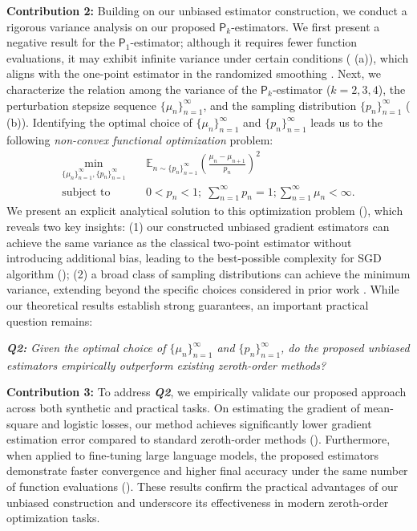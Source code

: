 \documentclass{article}
\newcommand{\EE}{\mathbb{E}}
\theoremstyle{definition}
\theoremstyle{plain}
\theoremstyle{remark}
\newcommand{\centerbox}[1]{\begin{center}\begin{minipage}{0.86\linewidth}
\begin{bluebox} 
\textit{{#1}}
\end{bluebox} \end{minipage}\end{center}}
\newcommand{\sfP}{\mathsf{P}}
\begin{document}
\textbf{Contribution 2:}  
Building on our unbiased estimator construction, we conduct a rigorous variance analysis on our proposed $\sfP_k$-estimators.  We first present a negative result for the $\sfP_1$-estimator;  although it requires fewer function evaluations, it may exhibit infinite variance under certain conditions ( (a)), which aligns with the one-point estimator in the randomized smoothing \citep{flaxman2005online}.   Next, we characterize the relation among the variance of  the $\sfP_k$-estimator ($k=2,3,4$), the perturbation stepsize sequence $\{\mu_n\}_{n=1}^\infty$, and the sampling distribution $\{p_n\}_{n=1}^\infty$ ( (b)). Identifying the optimal  choice of  $\{\mu_n\}_{n=1}^\infty$ and $\{p_n\}_{n=1}^\infty$ leads us to the following \textit{non-convex functional optimization} problem: 
\begin{align}\label{eq:functional-opt}
    \min_{\{\mu_n\}_{n=1}^\infty, \{p_n\}_{n=1}^\infty} \quad &\EE_{n \sim \{p_n\}_{n=1}^\infty} \left( \frac{\mu_n - \mu_{n+1}}{p_n}\right)^2  \\
    \text{subject to} \quad &0 < p_n < 1; \; \sum_{n=1}^\infty p_n=1; \sum_{n=1}^\infty \mu_n<\infty. \nonumber
\end{align} 
We present an explicit analytical solution to this optimization problem (), which reveals two key insights: (1) our constructed unbiased gradient estimators can achieve the same variance as the classical two-point estimator without introducing additional bias, leading to the best-possible complexity for SGD algorithm (); (2) a broad class of sampling distributions can achieve the minimum variance, extending beyond the specific choices considered in prior work \citep{chen2020unbiased}. While our theoretical results establish strong guarantees, an important practical question remains:

\centerbox{\textbf{Q2:} Given the optimal choice of $\{\mu_n\}_{n=1}^\infty$ and $\{p_n\}_{n=1}^\infty$, do the proposed unbiased estimators empirically outperform existing zeroth-order methods? }  
\textbf{Contribution 3:}  
To address \textit{\textbf{Q2}}, we empirically validate our proposed approach across both synthetic and practical tasks.   On estimating the gradient of mean-square and logistic losses, our method achieves significantly lower gradient estimation error compared to standard zeroth-order methods (). Furthermore, when applied to fine-tuning large language models, the proposed estimators demonstrate faster convergence and higher final accuracy under the same number of function evaluations (). These results confirm the practical advantages of our unbiased construction and underscore its effectiveness in modern zeroth-order optimization tasks.
  
\end{document}
